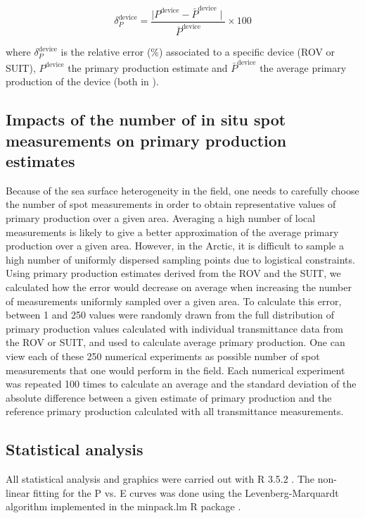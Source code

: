 \begin{linenomath*}
    \begin{equation}
		\delta_P^{\text{device}} = \frac{\mid P^{\text{device}} - \bar{P}^{\text{device}} \mid}{\bar{P}^{\text{device}}} \times 100
	\end{equation}
\end{linenomath*}

where $\delta_P^{\text{device}}$ is the relative error (\%) associated to a specific device (ROV or SUIT), $P^{\text{device}}$ the primary production estimate and $\bar{P}^{\text{device}}$ the average primary production of the device (both in \dailypp{}).

\subsection{Impacts of the number of in situ spot measurements on primary production estimates}

Because of the sea surface heterogeneity in the field, one needs to carefully choose the number of spot measurements in order to obtain representative values of primary production over a given area. Averaging a high number of local measurements is likely to give a better approximation of the average primary production over a given area. However, in the Arctic, it is difficult to sample a high number of uniformly dispersed sampling points due to logistical constraints. Using primary production estimates derived from the ROV and the SUIT, we calculated how the error would decrease on average when increasing the number of measurements uniformly sampled over a given area. To calculate this error, between 1 and 250 values were randomly drawn from the full distribution of primary production values calculated with individual transmittance data from the ROV or SUIT, and used to calculate average primary production. One can view each of these 250 numerical experiments as possible number of spot measurements that one would perform in the field. Each numerical experiment was repeated 100 times to calculate an average and the standard deviation of the absolute difference between a given estimate of primary production and the reference primary production calculated with all transmittance measurements.

\subsection{Statistical analysis}

All statistical analysis and graphics were carried out with R 3.5.2 \citep{RCoreTeam2018}. The non-linear fitting for the P vs. E curves was done using the Levenberg-Marquardt algorithm implemented in the minpack.lm R package \citep{Elzhov2013}. 
